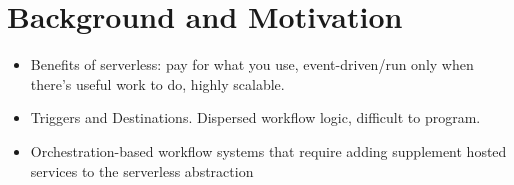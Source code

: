\section{Background and Motivation}\label{sec:bg}

\begin{table*}[]
\centering
{}
\caption{Comparison with existing work}
\label{table:positioning}
\end{table*}



\begin{itemize}

	\item Benefits of serverless: pay for what you use, event-driven/run only
	when there's useful work to do, highly scalable.

	\item Triggers and Destinations. Dispersed workflow logic, difficult to
	program.

	\item Orchestration-based workflow systems that require adding supplement
	hosted services to the serverless abstraction

\end{itemize}

